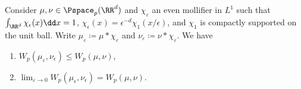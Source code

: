 \documentclass[oneside,reqno,letterpaper]{amsart}
\begin{document}
\begin{lemma}\label{prop:Wdist-convolution}
  Consider \(\mu, \nu \in \Pspace_p(\RR^d)\) and \(\chi_{\varepsilon}\) an even mollifier in \(L^1\) such that \(\int_{\RR^d} \chi_{\epsilon}(x) \dd x = 1\), \(\chi_{\epsilon}(x) = \epsilon^{-d} \chi_1(x / \epsilon)\), and \(\chi_1\) is compactly supported on the unit ball.
  Write \(\mu_{\varepsilon} \coloneqq \mu * \chi_{\varepsilon}\) and \(\nu_{\varepsilon} \coloneqq \nu * \chi_{\varepsilon}\).
  We have
  \begin{enumerate}[label=(\roman*)]
    \item \(W_p(\mu_{\varepsilon}, \nu_{\epsilon}) \leq W_p(\mu, \nu)\),
    \item \(\lim_{\varepsilon \to 0} W_p(\mu_{\epsilon}, \nu_{\epsilon}) = W_p(\mu, \nu)\).
  \end{enumerate}
\end{lemma}
\end{document}
